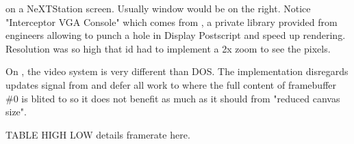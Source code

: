 \doom{} on a NeXTStation screen. Usually  window would be on the right. Notice "Interceptor VGA Console" which comes from , a private library provided from \NeXT engineers allowing to punch a hole in Display Postscript and speed up rendering. Resolution was so high that id had to implement a 2x zoom to see the pixels.\\
\par
{}

\vspace{-4mm}
On \NeXT, the video system is very different than DOS. The implementation disregards updates signal from  and defer all work to  where the full content of framebuffer \#0 is blited to  so it does not benefit as much as it should from "reduced canvas size".\\
\par
TABLE HIGH LOW details framerate here.

